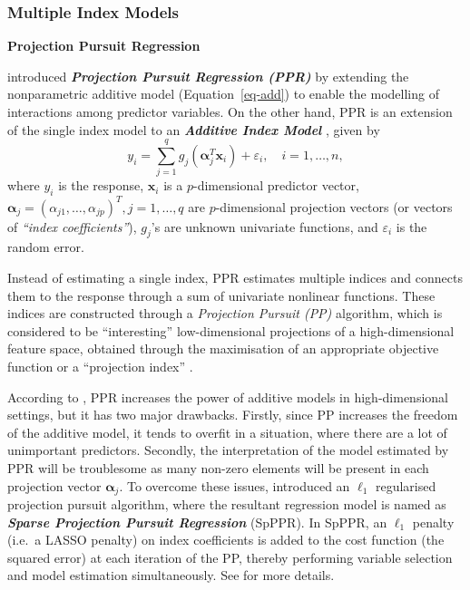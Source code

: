 \documentclass[
  11pt,
  a4paper,
]{article}
\begin{document}
\subsubsection{Multiple Index Models}\label{sec-multi-index}

\textbf{Projection Pursuit Regression}

\textcite{Friedman1981} introduced \textbf{\emph{Projection Pursuit
Regression (PPR)}} by extending the nonparametric additive model
(Equation~\ref{eq-add}) to enable the modelling of interactions among
predictor variables. On the other hand, PPR is an extension of the
single index model to an \textbf{\emph{Additive Index Model }}, given by
\[
  y_{i} = \sum_{j=1}^{q} {g_{j}(\bm{\alpha}_{j}^{T}\bm{x}_{i})} + \varepsilon_{i}, \quad i = 1, \dots, n,
\] where \(y_{i}\) is the response, \(\bm{x}_{i}\) is a
\(p\)-dimensional predictor vector,
\(\bm{\alpha}_{j} = \left ( \alpha_{j1}, \dots, \alpha_{jp} \right )^{T}, j = 1, \dots, q\)
are \(p\)-dimensional projection vectors (or vectors of \emph{``index
coefficients''}), \(g_{j}\)'s are unknown univariate functions, and
\(\varepsilon_{i}\) is the random error.

Instead of estimating a single index, PPR estimates multiple indices and
connects them to the response through a sum of univariate nonlinear
functions. These indices are constructed through a \emph{Projection
Pursuit (PP)} \autocite{Kruskal1969,Friedman1974} algorithm, which is
considered to be ``interesting'' low-dimensional projections of a
high-dimensional feature space, obtained through the maximisation of an
appropriate objective function or a ``projection index''
\autocite{Huber1985}.

According to \textcite{Zhang2008}, PPR increases the power of additive
models in high-dimensional settings, but it has two major drawbacks.
Firstly, since PP increases the freedom of the additive model, it tends
to overfit in a situation, where there are a lot of unimportant
predictors. Secondly, the interpretation of the model estimated by PPR
will be troublesome as many non-zero elements will be present in each
projection vector \(\bm{\alpha}_{j}\). To overcome these issues,
\textcite{Zhang2008} introduced an \(\ell_{1}\) regularised projection
pursuit algorithm, where the resultant regression model is named as
\textbf{\emph{Sparse Projection Pursuit Regression}} (SpPPR). In SpPPR,
an \(\ell_{1}\) penalty (i.e.~a LASSO penalty) on index coefficients is
added to the cost function (the squared error) at each iteration of the
PP, thereby performing variable selection and model estimation
simultaneously. See \textcite{Zhang2008} for more details.
\end{document}
